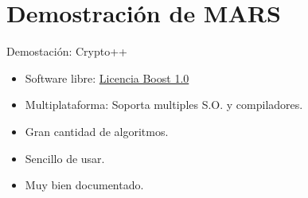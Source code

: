 \documentclass{beamer}
\begin{document}
\section{Demostración de MARS}
\begin{frame}{Demostación: Crypto++}

	\begin{itemize}
		\item Software libre: \href{https://www.cryptopp.com/License.txt}{Licencia Boost 1.0}
		\item Multiplataforma: Soporta multiples S.O. y compiladores.
		\item Gran cantidad de algoritmos.
		\item Sencillo de usar.
		\item Muy bien documentado.
	\end{itemize}


\end{frame}
\end{document}
